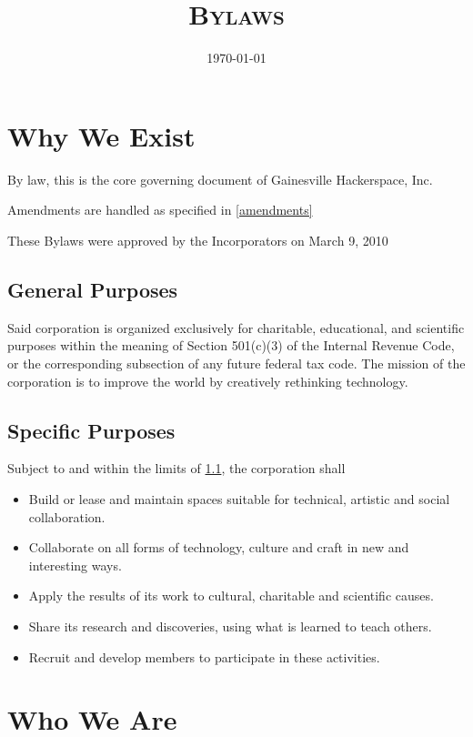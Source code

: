 \documentclass[10pt,letterpaper,titlepage]{article}
\title{%
    \textsc{\LARGE \corpname \\
    \Large Bylaws
    }
}
\date{\today}
\newcommand\corpname{Gainesville Hackerspace, Inc.}
\newcommand\approvaldate{March 9, 2010}
\begin{document}
\maketitle

\tableofcontents
\newpage

\section{Why We Exist}
\label{whyweexist}

By law, this is the core governing document of \corpname

Amendments are handled as specified in \ref{amendments}

These Bylaws were approved by the Incorporators on \approvaldate

\subsection{General Purposes}
\label{genpurp}

Said corporation is organized exclusively for charitable, educational, and
scientific purposes within the meaning of Section 501(c)(3) of the Internal
Revenue Code, or the corresponding subsection of any future federal tax code.
The mission of the corporation is to improve the world by creatively rethinking
technology. 

\subsection{Specific Purposes}

Subject to and within the limits of \ref{genpurp}, the corporation shall
\begin{itemize}
    \item Build or lease and maintain spaces suitable for technical, artistic
          and social collaboration.
    \item Collaborate on all forms of technology, culture and craft in new and
          interesting ways.
    \item Apply the results of its work to cultural, charitable and
          scientific causes.
    \item Share its research and discoveries, using what is learned to
          teach others.
    \item Recruit and develop members to participate in these activities.
\end{itemize}

\section{Who We Are}
\end{document}
